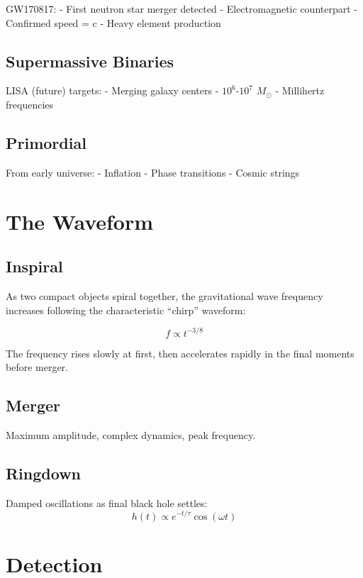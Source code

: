 \documentclass[
  11pt,
  letterpaper,
  twoside,
  openright]{book}
\begin{document}
GW170817: - First neutron star merger detected - Electromagnetic
counterpart - Confirmed speed = c - Heavy element production

\subsection{Supermassive Binaries}\label{supermassive-binaries}

LISA (future) targets: - Merging galaxy centers - \(10^6\)-\(10^7\)
\(M_\odot\) - Millihertz frequencies

\subsection{Primordial}\label{primordial}

From early universe: - Inflation - Phase transitions - Cosmic strings

\section{The Waveform}\label{the-waveform}

\subsection{Inspiral}\label{inspiral}

As two compact objects spiral together, the gravitational wave frequency
increases following the characteristic ``chirp'' waveform:

\[
f \propto t^{-3/8}
\]

The frequency rises slowly at first, then accelerates rapidly in the
final moments before merger.

\subsection{Merger}\label{merger}

Maximum amplitude, complex dynamics, peak frequency.

\subsection{Ringdown}\label{ringdown}

Damped oscillations as final black hole settles: \[
h(t) \propto e^{-t/\tau} \cos(\omega t)
\]

\section{Detection}\label{detection}
\end{document}
